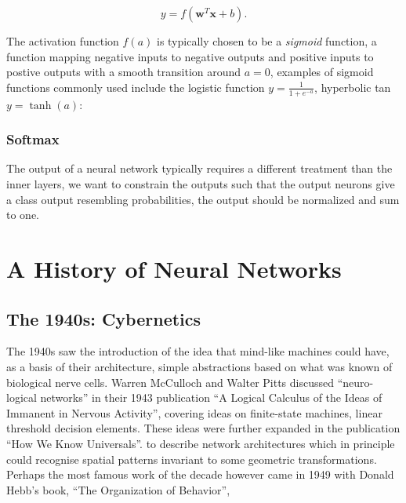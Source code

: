\documentclass[thesis]{subfiles}
\begin{document}
\begin{equation}
    y = f(\mathbf{w}^T\mathbf{x} + b).
\end{equation}

The activation function $f(a)$ is typically chosen to be a \emph{sigmoid} function, \ie a function mapping negative inputs to negative outputs and positive inputs to postive outputs with a smooth transition around $a = 0$, examples of sigmoid functions commonly used include the logistic function $y = \frac{1}{1+e^{-a}}$, hyperbolic tan $y = \tanh(a)$:

\subsubsection{Softmax}
The output of a neural network typically requires a different treatment than the inner layers, we want to constrain the outputs such that the output neurons give a class output resembling probabilities, \ie the output should be normalized and sum to one. 

\section{A History of Neural Networks}

\subsection{The 1940s: Cybernetics}
The 1940s saw the introduction of the idea that mind-like machines could have, as a basis of their architecture, simple abstractions based on what was known of biological nerve cells. Warren McCulloch and Walter Pitts discussed ``neuro-logical networks'' in their 1943 publication ``A Logical Calculus of the Ideas of Immanent in Nervous Activity'', covering ideas on finite-state machines, linear threshold decision elements. These ideas were further expanded in the publication ``How We Know Universals''. to describe network architectures which in principle could recognise spatial patterns invariant to some geometric transformations. Perhaps the most famous work of the decade however came in 1949 with Donald Hebb's book, ``The Organization of Behavior'',
\end{document}
